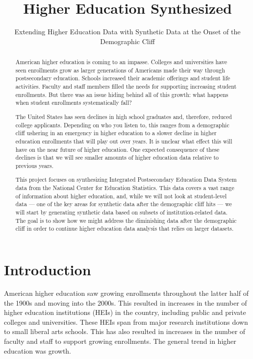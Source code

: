 \documentclass[sigconf, authorversion, nonacm]{acmart}
\begin{document}
\title{Higher Education Synthesized}
\subtitle{Extending Higher Education Data with Synthetic Data at the Onset of the Demographic Cliff}

\begin{abstract}
    American higher education is coming to an impasse. Colleges and universities have seen enrollments grow as larger generations of Americans made their way through postsecondary education. Schools increased their academic offerings and student life activities. Faculty and staff members filled the needs for supporting increasing student enrollments. But there was an issue hiding behind all of this growth: what happens when student enrollments systematically fall?

    The United States has seen declines in high school graduates and, therefore, reduced college applicants. Depending on who you listen to, this ranges from a demographic cliff ushering in an emergency in higher education to a slower decline in higher education enrollments that will play out over years. It is unclear what effect this will have on the near future of higher education. One expected consequence of these declines is that we will see smaller amounts of higher education data relative to previous years.

    This project focuses on synthesizing Integrated Postsecondary Education Data System data from the National Center for Education Statistics. This data covers a vast range of information about higher education, and, while we will not look at student-level data --- one of the key areas for synthetic data after the demographic cliff hits --- we will start by generating synthetic data based on subsets of institution-related data. The goal is to show how we might address the diminishing data after the demographic cliff in order to continue higher education data analysis that relies on larger datasets.
\end{abstract}

\maketitle

\section{Introduction}
    American higher education saw growing enrollments throughout the latter half of the 1900s and moving into the 2000s. This resulted in increases in the number of higher education institutions (HEIs) in the country, including public and private colleges and universities. These HEIs span from major research institutions down to small liberal arts schools. This has also resulted in increases in the number of faculty and staff to support growing enrollments. The general trend in higher education was growth.
\end{document}
